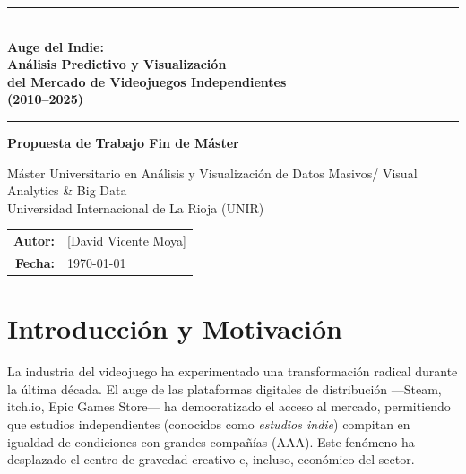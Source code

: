 \documentclass[12pt, a4paper]{article}
\begin{document}
\begin{titlepage}
  \centering
  \vspace*{1.5cm}

  {\color{unirblue}\rule{\linewidth}{1.5pt}}\\[0.4cm]
  {\LARGE\bfseries\color{unirblue}
    Auge del Indie:\\[0.3cm]
    An\'alisis Predictivo y Visualizaci\'on\\[0.3cm]
    del Mercado de Videojuegos Independientes\\[0.3cm]
    (2010--2025)
  }\\[0.4cm]
  {\color{unirblue}\rule{\linewidth}{1.5pt}}

  \vspace{1.2cm}
  {\large\bfseries Propuesta de Trabajo Fin de M\'aster}

  \vspace{0.6cm}
  {\large M\'aster Universitario en An\'alisis y Visualizaci\'on de Datos Masivos/ 
  Visual Analytics \& Big Data}\\[0.2cm]
  {\large\color{unirblue} Universidad Internacional de La Rioja (UNIR)}

  \vfill

  \begin{tabular}{rl}
    \textbf{Autor:}     & [David Vicente Moya] \\[4pt]
    \textbf{Fecha:}     & \today \\
  \end{tabular}

  \vspace{1.5cm}
\end{titlepage}

\tableofcontents
\newpage

\section{Introducci\'on y Motivaci\'on}

La industria del videojuego ha experimentado una transformaci\'on radical durante la 
\'ultima d\'ecada. El auge de las plataformas digitales de distribuci\'on ---Steam, 
itch.io, Epic Games Store--- ha democratizado el acceso al mercado, permitiendo que 
estudios independientes (conocidos como \textit{estudios indie}) compitan en igualdad 
de condiciones con grandes compa\~n\'ias (AAA). Este fen\'omeno ha desplazado el 
centro de gravedad creativo e, incluso, econ\'omico del sector.
\end{document}

